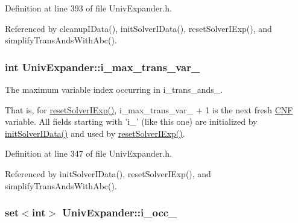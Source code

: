 Definition at line 393 of file Univ\-Expander.\-h.



Referenced by cleanup\-I\-Data(), init\-Solver\-I\-Data(), reset\-Solver\-I\-Exp(), and simplify\-Trans\-Ands\-With\-Abc().

\hypertarget{classUnivExpander_a72fe5c141f55cc4e6097509d2309e2f7}{
\subsubsection[{i\-\_\-max\-\_\-trans\-\_\-var\-\_\-}]{\setlength{\rightskip}{0pt plus 5cm}int Univ\-Expander\-::i\-\_\-max\-\_\-trans\-\_\-var\-\_\-\hspace{0.3cm}{\ttfamily [protected]}}}\label{classUnivExpander_a72fe5c141f55cc4e6097509d2309e2f7}


The maximum variable index occurring in i\-\_\-trans\-\_\-ands\-\_\-. 

That is, for \hyperlink{classUnivExpander_a1d6935778cefc0b441db0d7f16933a48}{reset\-Solver\-I\-Exp()}, i\-\_\-max\-\_\-trans\-\_\-var\-\_\- + 1 is the next fresh \hyperlink{classCNF}{C\-N\-F} variable. All fields starting with 'i\-\_\-' (like this one) are initialized by \hyperlink{classUnivExpander_a87f2309e7e1d511d9539872b08814c40}{init\-Solver\-I\-Data()} and used by \hyperlink{classUnivExpander_a1d6935778cefc0b441db0d7f16933a48}{reset\-Solver\-I\-Exp()}. 

Definition at line 347 of file Univ\-Expander.\-h.



Referenced by init\-Solver\-I\-Data(), reset\-Solver\-I\-Exp(), and simplify\-Trans\-Ands\-With\-Abc().

\hypertarget{classUnivExpander_ae1f970b4ccd465626cdb1fb8978f9fae}{
\subsubsection[{i\-\_\-occ\-\_\-}]{\setlength{\rightskip}{0pt plus 5cm}set$<$int$>$ Univ\-Expander\-::i\-\_\-occ\-\_\-\hspace{0.3cm}{\ttfamily [protected]}}}\label{classUnivExpander_ae1f970b4ccd465626cdb1fb8978f9fae}



